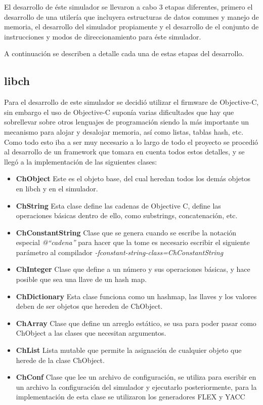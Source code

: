 El desarrollo de éste simulador se llevaron a cabo 3 etapas diferentes, primero el desarrollo de una utilería que incluyera estructuras de datos comunes y manejo de memoria, el desarrollo del simulador propiamente y el desarrollo de el conjunto de instrucciones y modos de direccionamiento para éste simulador.

A continuación se describen a detalle cada una de estas etapas del desarrollo.

\subsection{libch}

Para el desarrollo de este simulador se decidió utilizar el firmware de Objective-C, sin embargo el uso de Objective-C suponía varias dificultades que hay que sobrellevar sobre otros lenguajes de programación siendo la más importante un mecanismo para alojar y desalojar memoria, así como listas, tablas hash, etc. Como todo esto iba a ser muy necesario a lo largo de todo el proyecto se procedió al desarrollo de un framework que tomara en cuenta todos estos detalles, y se llegó a la implementación de las siguientes clases:

\begin{itemize}
\item \textbf{ChObject} Este es el objeto base, del cual heredan todos los demás objetos en libch y en el simulador.
\item \textbf{ChString} Esta clase define las cadenas de Objective C, define las operaciones básicas dentro de ello, como substrings, concatenación, etc.
\item \textbf{ChConstantString} Clase que se genera cuando se escribe la notación especial \emph{@``cadena''} para hacer que la tome es necesario escribir el siguiente parámetro al compilador \emph{-fconstant-string-class=ChConstantString}
\item \textbf{ChInteger} Clase que define a un número y sus operaciones básicas, y hace posible que sea una llave de un hash map.
\item \textbf{ChDictionary} Esta clase funciona como un hashmap, las llaves y los valores deben de ser objetos que hereden de ChObject.
\item \textbf{ChArray} Clase que define un arreglo estático, se usa para poder pasar como ChObject a las clases que necesitan argumentos.
\item \textbf{ChList} Lista mutable que permite la asignación de cualquier objeto que herede de la clase ChObject.
\item \textbf{ChConf} Clase que lee un archivo de configuración, se utiliza para escribir en un archivo la configuración del simulador y ejecutarlo posteriormente, para la implementación de esta clase se utilizaron los generadores \ac{FLEX} y \ac{YACC}

\end{itemize}


